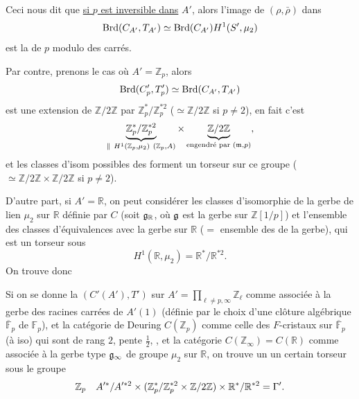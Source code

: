 Ceci nous dit que \uline{si $p$ est inversible dans} $A'$, alors l'image de $(\rho,\bar\rho)$ dans
\[
\operatorname{Brd}(C_{A'},T_{A'})
\simeq\operatorname{Brd}(C_{A'})
H^1(S',\mu_2)
\]
est la  de $p$ modulo des carrés.

Par contre, prenons le cas où $A'=\mathbb Z_p$, alors
\[
\operatorname{Brd}(C'_p,T'_p)
\simeq\operatorname{Brd}(C_{A'},T_{A'})
\]
est une extension de $\mathbb Z/2\mathbb Z$ par
$\mathbb Z_p^*/\mathbb Z_p^{*2}$
($\simeq\mathbb Z/2\mathbb Z$ si $p\ne2$), en fait c'est
\[
\underbrace{\mathbb Z_p^*/\mathbb Z_p^{*2}}_
{\parallel\ H^1(\mathbb Z_p,\mu_2)\ (\mathbb Z_p,A)}
\times
\underbrace{\mathbb Z/2\mathbb Z}_{\text{engendré par }(\mathfrak m,p)},
\]
et les classes d'isom possibles des 
forment un torseur sur ce groupe
(
$\simeq\mathbb Z/2\mathbb Z\times\mathbb Z/2\mathbb Z$ si $p\ne2$).

D'autre part, si $A'=\mathbb R$, on peut considérer les classes d'isomorphie de la gerbe de lien $\mu_2$ sur $\mathbb R$ définie par $C$ (soit $\mathfrak g_{\mathbb R}$, où $\mathfrak g$ est la gerbe sur $\mathbb Z[1/p]$) et l'ensemble des classes d'équivalences avec la gerbe  sur $\mathbb R$ ($=$ ensemble des \uline{} de la gerbe), qui est un torseur sous
\[
H^1(\mathbb R,\mu_2)=\mathbb R^*/\mathbb R^{*2}.
\]
On trouve donc


Si on se donne la  
$(C'(A'),T')$ sur $A'=\prod_{\ell\ne p,\infty}\mathbb Z_\ell$ comme associée à la gerbe des racines carrées de $A'(1)$ (définie par le choix d'une clôture algébrique $\overline{\mathbb F}_p$ de $\mathbb F_p$), et la catégorie de Deuring $C(\mathbb Z_p)$ comme celle des $F$-cristaux sur $\overline{\mathbb F}_p$ (à iso) qui sont de rang $2$,  pente $\frac12$, , et la 
catégorie $C(\mathbb Z_\infty)=C(\mathbb R)$ comme associée à la gerbe type $\mathfrak g_\infty$ de groupe $\mu_2$ sur $\mathbb R$, on trouve un 
 un certain torseur  sous le groupe
\[
\mathbb Z_p\quad
A'^*/A'^{*2}\times
(\mathbb Z_p^*/\mathbb Z_p^{*2}\times\mathbb Z/2\mathbb Z)
\times\mathbb R^*/\mathbb R^{*2}=\Gamma'.
\]

